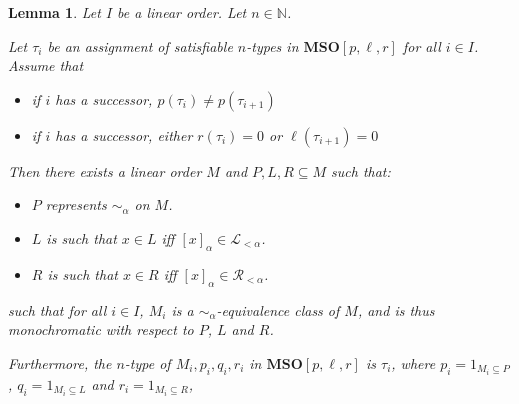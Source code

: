 \documentclass{article}
\newtheorem{lemma}{Lemma}
\newcommand{\brackets}[1]{\left[ {#1} \right]}
\newcommand{\mso}{\mathbf{MSO}}
\newcommand{\NN}{\mathbb{N}}
\begin{document}
\begin{lemma}
  Let $I$ be a linear order. Let $n \in \NN$.

  Let $\tau_i$ be an assignment of satisfiable $n$-types in $\mso[p, \ell, r]$ for all $i \in I$. Assume that
  \begin{itemize}
    \item if $i$ has a successor, $p(\tau_i) \ne p(\tau_{i+1})$
    \item if $i$ has a successor, either $r(\tau_i) = 0$ or $\ell(\tau_{i+1}) = 0$
  \end{itemize}

  Then there exists a linear order $M$ and $P, L, R \subseteq M$ such that:
  \begin{itemize}
    \item $P$ represents $\sim_{\alpha}$ on $M$.
    \item $L$ is such that $x \in L$ iff $\brackets{x}_{\alpha} \in \mathcal{L}_{< \alpha}$.
    \item $R$ is such that $x \in R$ iff $\brackets{x}_{\alpha} \in \mathcal{R}_{< \alpha}$.
  \end{itemize}

  such that for all $i \in I$, $M_i$ is a $\sim_{\alpha}$-equivalence class of $M$,
  and is thus monochromatic with respect to $P$, $L$ and $R$.

  Furthermore, the $n$-type of $M_i, p_i, q_i, r_i$ in $\mso[p, \ell, r]$ is $\tau_i$, where
  $p_i = 1_{M_i \subseteq P}$, $q_i = 1_{M_i \subseteq L}$ and $r_i = 1_{M_i \subseteq R}$,
\end{lemma}
\end{document}
